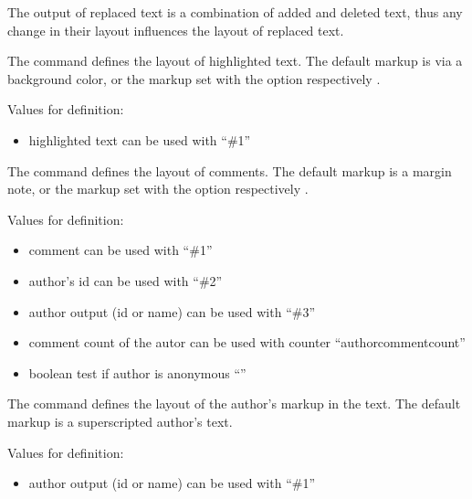 The output of replaced text is a combination of added and deleted text, thus any change in their layout influences the layout of replaced text.





The command  defines the layout of highlighted text.
The default markup is via a background color, or the markup set with the option  respectively .

Values for definition:

\begin{itemize}
	\item highlighted text can be used with ``\#1''
\end{itemize}





The command  defines the layout of comments.
The default markup is a margin note, or the markup set with the option  respectively .

Values for definition:

\begin{itemize}
	\item comment can be used with ``\#1''
	\item author's id can be used with ``\#2''
	\item author output (id or name) can be used with ``\#3''
	\item comment count of the autor can be used with counter ``authorcommentcount''
	\item boolean test if author is anonymous ``''
\end{itemize}





The command  defines the layout of the author's markup in the text.
The default markup is a superscripted author's text.

Values for definition:

\begin{itemize}
	\item author output (id or name) can be used with ``\#1''
\end{itemize}

